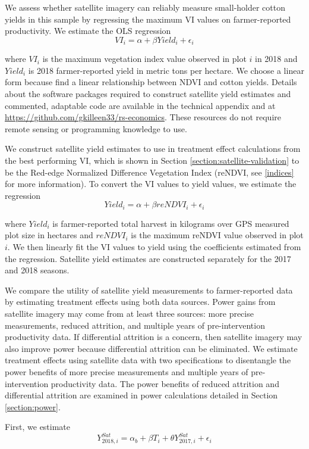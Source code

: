 \documentclass{article}
\begin{document}
We assess whether satellite imagery can reliably measure small-holder cotton yields in this sample by regressing the maximum VI values on farmer-reported productivity. We estimate the OLS regression
$$
VI_i = \alpha + \beta Yield_i + \epsilon_i
$$

where $VI_i$ is the maximum vegetation index value observed in plot $i$ in 2018 and $Yield_i$ is 2018 farmer-reported yield in metric tons per hectare. We choose a linear form because \citet{Stamatiadis2010Ground-basedCotton} find a linear relationship between NDVI and cotton yields. Details about the software packages required to construct satellite yield estimates and commented, adaptable code are available in the technical appendix and at \url{https://github.com/gkilleen33/rs-economics}. These resources do not require remote sensing  or programming knowledge to use.

We construct satellite yield estimates to use in treatment effect calculations from the best performing VI, which is shown in Section \ref{section:satellite-validation} to be the Red-edge Normalized Difference Vegetation Index (reNDVI, see \ref{indices} for more information). To convert the VI values to yield values, we estimate the regression 
$$
Yield_i = \alpha + \beta reNDVI_i + \epsilon_i
$$

where $Yield_i$ is farmer-reported total harvest in kilograms over GPS measured plot size in hectares and $reNDVI_i$ is the maximum reNDVI value observed in plot $i$. We then linearly fit the VI values to yield using the coefficients estimated from the regression. Satellite yield estimates are constructed separately for the 2017 and 2018 seasons.

We compare the utility of satellite yield measurements to farmer-reported data by estimating treatment effects using both data sources. Power gains from satellite imagery may come from at least three sources: more precise measurements, reduced attrition, and multiple years of pre-intervention productivity data. If differential attrition is a concern, then satellite imagery may also improve power because differential attrition can be eliminated. We estimate treatment effects using satellite data with two specifications to disentangle the power benefits of more precise measurements and multiple years of pre-intervention productivity data. The power benefits of reduced attrition and differential attrition are examined in power calculations detailed in Section \ref{section:power}. 

First, we estimate 
$$
Y_{2018,i}^{Sat} = \alpha_b + \beta T_i + \theta Y_{2017,i}^{Sat} + \epsilon_i
$$
\end{document}
